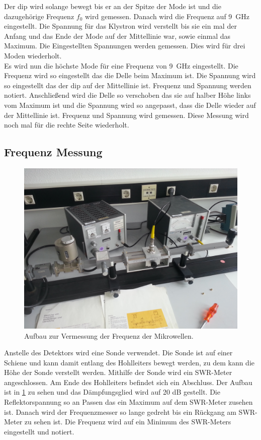 Der dip wird solange bewegt bis er an der Spitze der Mode ist und die dazugehörige Frequenz $f_0$ wird gemessen. Danach wird die Frequenz auf \SI{9}{\giga\hertz} eingestellt. Die Spannung für das Klystron wird verstellt bis sie ein mal der Anfang und das Ende der Mode auf der Mittellinie war, sowie einmal das Maximum. Die Eingestellten Spannungen werden gemessen. Dies wird für drei Moden wiederholt.\\
Es wird nun die höchste Mode für eine Frequenz von \SI{9}{\giga\hertz} eingestellt. Die Frequenz wird so eingestellt das die Delle beim Maximum ist. Die Spannung wird so eingestellt das der dip auf der Mittellinie ist. Frequenz und Spannung werden notiert. Anschließend wird die Delle so verschoben das sie auf halber Höhe links vom Maximum ist und die Spannung wird so angepasst, dass die Delle wieder auf der Mittellinie ist. Frequenz und Spannung wird gemessen. Diese Messung wird noch mal für die rechte Seite wiederholt.
\subsection{Frequenz Messung}
\begin{figure}[h!]
	\centering
	\includegraphics[scale = 0.1]{../Grafiken/Aufbau_2.jpg}
	\caption{Aufbau zur Vermessung der Frequenz der Mikrowellen.}\label{fig:AufbauFrequenz}
\end{figure}
Anstelle des Detektors wird eine Sonde verwendet. Die Sonde ist auf einer Schiene und kann damit entlang des Hohlleiters bewegt werden, zu dem kann die Höhe der Sonde verstellt werden. Mithilfe der Sonde wird ein SWR-Meter angeschlossen. Am Ende des Hohlleiters befindet sich ein Abschluss. Der Aufbau ist in \cref{fig:AufbauFrequenz} zu sehen und das Dämpfungsglied wird auf 20 dB gestellt. Die Reflektorspannung so an Passen das ein Maximum auf dem SWR-Meter zusehen ist. Danach wird der Frequenzmesser so lange gedreht bis ein Rückgang am SWR-Meter zu sehen ist. Die Frequenz wird auf ein Minimum des SWR-Meters eingestellt und notiert.\newpage
